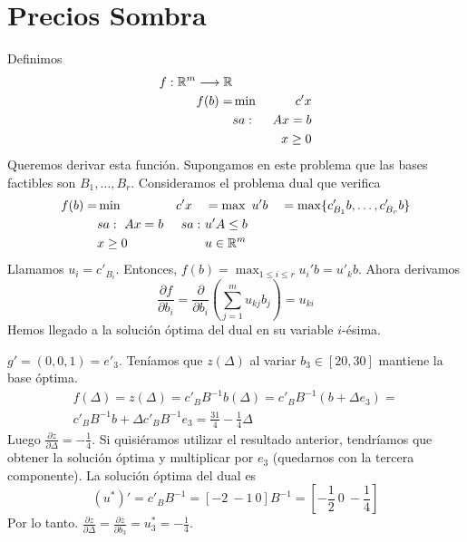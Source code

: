 \documentclass[PM.tex]{subfiles}
\begin{document}
\section{Precios Sombra}
Definimos 
\begin{align*}
f:\mathbb{R}^m\longrightarrow \mathbb{R} & & &\\
 f(b) = & \min\ & c'x\\
                                &sa:\  & Ax=b\\
       							& & x\geq 0
\end{align*}
Queremos derivar esta función. Supongamos en este problema que las bases factibles son $B_1,\dots, B_r$. Consideramos el problema dual que verifica
\begin{align*}
 f(b) = & \min\ & c'x\quad  & =\max\ u'b \quad  = \max\{c'_{B_1}b,\dots, c'_{B_r}b\}\\
        &sa:\   Ax=b       &sa:\ & u'A\leq b\\
        &  x\geq 0         & & u\in\mathbb{R}^m 
\end{align*}
Llamamos $u_i=c'_{B_i}$. Entonces, $f(b)=\max_{1\leq i\leq r}u_i'b=u'_k b$. Ahora derivamos
\[\frac{\partial f}{\partial b_i}=\frac{\partial }{\partial b_i}\left(\sum_{j=1}^m u_{kj}b_j\right)=u_{ki}\]
Hemos llegado a la solución óptima del dual en su variable $i$-ésima. 
\begin{example}
$g'=(0,0,1)=e'_3$. Teníamos que $z(\Delta)$ al variar $b_3\in [20,30]$ mantiene la base óptima.
\begin{gather*}
f(\Delta)= z(\Delta)=c'_B B^{-1}b(\Delta)=c'_B B^{-1}(b+\Delta e_3)=\\
c'_B B^{-1} b +\Delta c'_B B^{-1} e_3 =\frac{31}{4}-\frac{1}{4}\Delta
\end{gather*}
Luego $\frac{\partial z}{\partial\Delta}=-\frac{1}{4}$. Si quisiéramos utilizar el resultado anterior, tendríamos que obtener la solución óptima y multiplicar por $e_3$ (quedarnos con la tercera componente). La solución óptima del dual es
\[(u^*)'=c'_B B^{-1}=[-2\ -1\ 0]B^{-1}=[-\frac{1}{2}\ 0\ -\frac{1}{4}]\]
Por lo tanto. $\frac{\partial z}{\partial\Delta}=\frac{\partial z}{\partial b_3}=u^*_3=-\frac{1}{4}$.
\end{example}
\newpage
\end{document}
